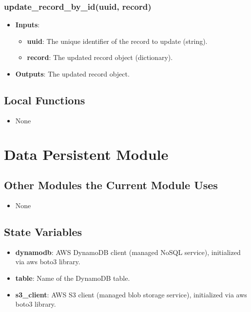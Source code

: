 \documentclass[12pt, titlepage]{article}
\begin{document}
\subsubsection{update\_record\_by\_id(uuid, record)}
\begin{itemize}
    \item \textbf{Inputs}:
        \begin{itemize}
            \item \textbf{uuid}: The unique identifier of the record to update (string).
            \item \textbf{record}: The updated record object (dictionary).
        \end{itemize}
    \item \textbf{Outputs}: The updated record object.
\end{itemize}


\subsection{Local Functions}
\begin{itemize}
\item None
\end{itemize}


\section{Data Persistent Module}
\label{Data Persistence Module}

\subsection{Other Modules the Current Module Uses}
\begin{itemize}
    \item None
\end{itemize}

\subsection{State Variables}
\begin{itemize}
    \item \textbf{dynamodb}: AWS DynamoDB client (managed NoSQL service), initialized via aws boto3 library.
    \item \textbf{table}: Name of the DynamoDB table.
    \item \textbf{s3\_client}: AWS S3 client (managed blob storage service), initialized via aws boto3 library.
\end{itemize}
\end{document}
